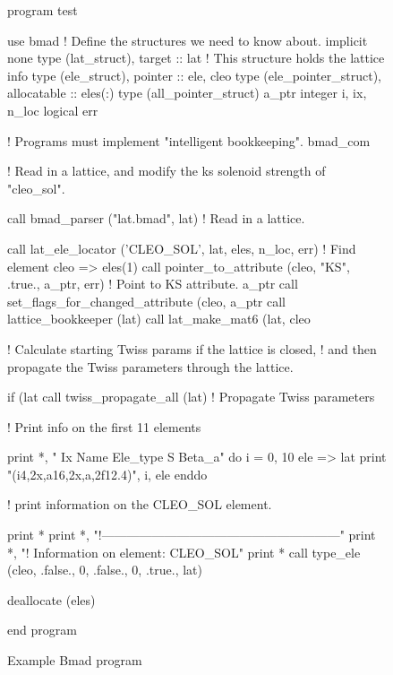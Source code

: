 \begin{figure}[htp]
\begin{listing}{1}
program test

use bmad                 ! Define the structures we need to know about.
implicit none
type (lat_struct), target :: lat   ! This structure holds the lattice info
type (ele_struct), pointer :: ele, cleo
type (ele_pointer_struct), allocatable :: eles(:)
type (all_pointer_struct) a_ptr
integer i, ix, n_loc
logical err

! Programs must implement "intelligent bookkeeping".
bmad_com%

! Read in a lattice, and modify the ks solenoid strength of "cleo_sol".

call bmad_parser ("lat.bmad", lat)  ! Read in a lattice.

call lat_ele_locator ('CLEO_SOL', lat, eles, n_loc, err)  ! Find element
cleo => eles(1)%
call pointer_to_attribute (cleo, "KS", .true., a_ptr, err) ! Point to KS attribute.
a_ptr%
call set_flags_for_changed_attribute (cleo, a_ptr%
call lattice_bookkeeper (lat)
call lat_make_mat6 (lat, cleo%

! Calculate starting Twiss params if the lattice is closed, 
! and then propagate the Twiss parameters through the lattice.

if (lat%
call twiss_propagate_all (lat)      ! Propagate Twiss parameters

! Print info on the first 11 elements

print *, " Ix  Name              Ele_type                   S      Beta_a"
do i = 0, 10
  ele => lat%
  print "(i4,2x,a16,2x,a,2f12.4)", i, ele%
enddo

! print information on the CLEO_SOL element.

print *
print *, "!---------------------------------------------------------"
print *, "! Information on element: CLEO_SOL"
print *
call type_ele (cleo, .false., 0, .false., 0, .true., lat)

deallocate (eles)

end program
\end{listing}
\caption{Example Bmad program}
\label{f:program}
\end{figure}

